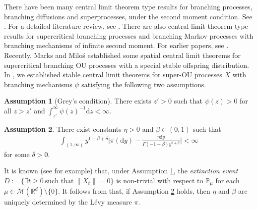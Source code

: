 \documentclass[12pt,a4paper]{amsart}
\theoremstyle{plain}
\theoremstyle{definition}
\newtheorem{asp}{Assumption}
\numberwithin{equation}{section}
\begin{document}
	There have been many central limit theorem type results for branching processes, branching diffusions and superprocesses, under the second moment condition.
	See \cite{AdamczakMilos2015CLT, AsmussenHering1983Branching, Athreya1969Limit,Athreya1969LimitB,Athreya1971Some, Heyde1970A-rate, HeydeBrown1871An-invariance, HeydeLeslie1971Improved, KestenStigum1966Additional,KestenStigum1966A-limit,Milos2012Spatial,RenSongZhang2014Central,RenSongZhang2014CentralB, RenSongZhang2015Central,RenSongZhang2017Central}.
	For a detailed literature review, see \cite[Section 1.1]{RenSongSunZhao2019Stable}.
	There are also  central  limit theorem type results for supercritical branching processes and branching Markov processes with branching mechanisms of infinite second moment.
	For earlier papers, see \cite{Asmussen76Convergence, Heyde1971Some}. 	
	Recently, Marks and Milo\'s \cite{MarksMilos2018CLT} established some spatial central limit theorems for supercritical branching OU processes with a special stable offspring distribution.
	In \cite{RenSongSunZhao2019Stable}, we established stable central limit theorems for super-OU processes $X$ with branching mechanisms $\psi$ satisfying the following two assumptions.

\begin{asp}[Grey's condition]
\label{asp: Greys condition}
	There exists $z' > 0$ such that $\psi(z) > 0$ for all $z>z'$ and  $\int_{z'}^\infty \psi(z)^{-1} \mathrm dz < \infty$.
\end{asp}

\begin{asp}
\label{asp: branching mechanism}
  	There exist constants $\eta > 0$ and $\beta \in (0,1)$ such that
\begin{align}
    \int_{(1,\infty)}y^{1+\beta +\delta}\Big|\pi(\mathrm dy)-\frac{\eta \mathrm dy}{\Gamma(-1-\beta)y^{2+\beta}}\Big| <\infty
\end{align}
	for some $\delta > 0$.
\end{asp}

	It is known (see \cite[Theorems 12.5 \& 12.7]{Kyprianou2014Fluctuations} for example) that, under Assumption \ref{asp: Greys condition}, the \emph{extinction event}
$
	D
	:=\{\exists t\geq 0~\text{such that}~ \|X_t\| =0 \}
$ 
	is non-trivial with respect to $\mathbb P_\mu$ for each  $\mu \in \mathcal M(\mathbb R^d)\setminus\{0\}$.
	It follows from \cite[Lemma 2.2]{RenSongSunZhao2019Stable}  that, if Assumption \ref{asp: branching mechanism} holds, then $\eta$ and $\beta$ are uniquely determined by the L\'evy measure $\pi$.
\end{document}
